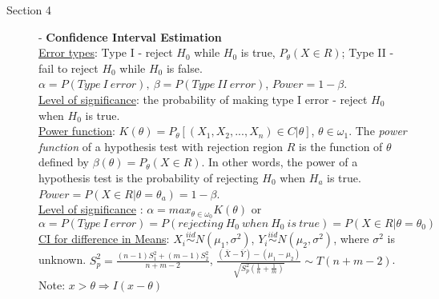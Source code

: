 \documentclass[10pt,landscape]{article}
\begin{document}
\begin{multicols}{3}
    \begin{description}
    		\item[Section 4] - \textbf{Confidence Interval Estimation}\\ %
    		\underline{Error types}: Type I - reject $H_0$ while $H_0$ is true, $P_{\theta}(X\in R)$; Type II - fail to reject $H_0$ while $H_0$ is false. $\alpha = P(Type\ I\ error),\ \beta =  P(Type\ II\ error)$, $Power = 1 - \beta$. \\
    		\underline{Level of significance}: the probability of making type I error - reject $H_0$ when $H_0$ is true. \\ 
    		\underline{Power function}: $K(\theta) = P_{\theta}[(X_1, X_2, ..., X_n) \in C | \theta]$,  $\theta \in \omega_1$. The \textit{power function} of a hypothesis test with rejection region $R$ is the function of $\theta$ defined by $\beta(\theta) = P_{\theta}(X\in R)$. In other words,  the power of a hypothesis test is the probability of rejecting $H_0$ when $H_a$  is true. $Power = P(X\in R|\theta = \theta_a) = 1 - \beta$.\\
    		\underline{Level of significance} : $\alpha =  max_{\theta	\in \omega_0} K(\theta)$ or $\alpha = P(Type\ I\ error) = P(rejecting\ H_0\ when\ H_0\ is\ true) = P(X\in R | \theta = \theta_0)$\\
    		\underline{CI for difference in Means}: $X_i \overset{iid} \sim N(\mu_1, \sigma^2)$, $Y_i \overset{iid} \sim N(\mu_2, \sigma^2)$, where $\sigma^2$ is unknown. $S_p^2 = \frac{(n-1)S_1^2 + (m-1)S_2^2}{n+m-2}$, $\frac{(\bar{X} - \bar{Y}) - (\mu_1 - \mu_2)}{\sqrt{S_p^2(\frac{1}{n} + \frac{1}{m})}} \sim T(n+m-2)$. \\
    		Note: $x > \theta	\Rightarrow I(x - \theta)$
    		
    		
    \end{description}   
    

\end{multicols}
\end{document}
